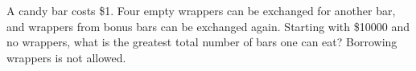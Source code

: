 A candy bar costs \$1. Four empty wrappers can be exchanged for another bar, and wrappers from bonus bars can be exchanged again. Starting with \$10000 and no wrappers, what is the greatest total number of bars one can eat? Borrowing wrappers is not allowed.
